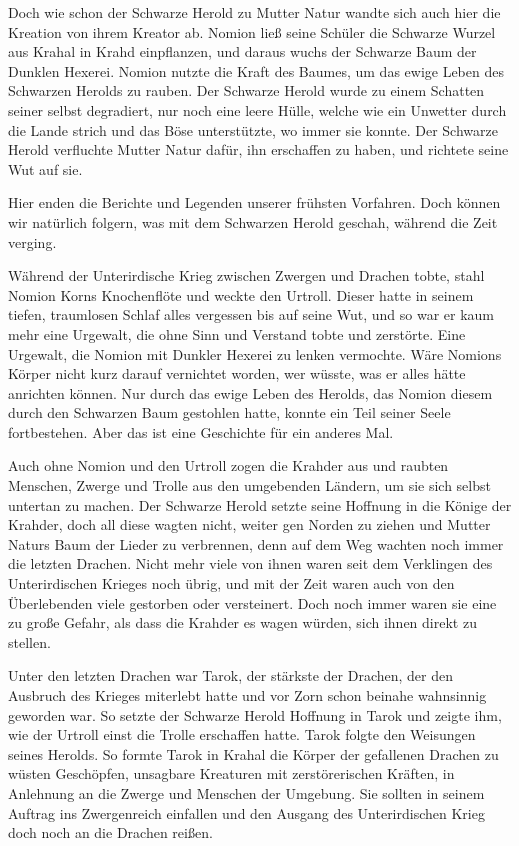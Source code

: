 Doch wie schon der Schwarze Herold zu Mutter Natur wandte sich auch hier die Kreation von ihrem Kreator ab. Nomion ließ seine Schüler die Schwarze Wurzel aus Krahal in Krahd einpflanzen, und daraus wuchs der Schwarze Baum der Dunklen Hexerei. Nomion nutzte die Kraft des Baumes, um das ewige Leben des Schwarzen Herolds zu rauben. Der Schwarze Herold wurde zu einem Schatten seiner selbst degradiert, nur noch eine leere Hülle, welche wie ein Unwetter durch die Lande strich und das Böse unterstützte, wo immer sie konnte. Der Schwarze Herold verfluchte Mutter Natur dafür, ihn erschaffen zu haben, und richtete seine Wut auf sie.

\trennzeichen

Hier enden die Berichte und Legenden unserer frühsten Vorfahren. Doch können wir natürlich folgern, was mit dem Schwarzen Herold geschah, während die Zeit verging.

Während der Unterirdische Krieg zwischen Zwergen und Drachen tobte, stahl Nomion Korns Knochenflöte und weckte den Urtroll. Dieser hatte in seinem tiefen, traumlosen Schlaf alles vergessen bis auf seine Wut, und so war er kaum mehr eine Urgewalt, die ohne Sinn und Verstand tobte und zerstörte. Eine Urgewalt, die Nomion mit Dunkler Hexerei zu lenken vermochte. Wäre Nomions Körper nicht kurz darauf vernichtet worden, wer wüsste, was er alles hätte anrichten können. Nur durch das ewige Leben des Herolds, das Nomion diesem durch den Schwarzen Baum gestohlen hatte, konnte ein Teil seiner Seele fortbestehen. Aber das ist eine Geschichte für ein anderes Mal.

Auch ohne Nomion und den Urtroll zogen die Krahder aus und raubten Menschen, Zwerge und Trolle aus den umgebenden Ländern, um sie sich selbst untertan zu machen. Der Schwarze Herold setzte seine Hoffnung in die Könige der Krahder, doch all diese wagten nicht, weiter gen Norden zu ziehen und Mutter Naturs Baum der Lieder zu verbrennen, denn auf dem Weg wachten noch immer die letzten Drachen. Nicht mehr viele von ihnen waren seit dem Verklingen des Unterirdischen Krieges noch übrig, und mit der Zeit waren auch von den Überlebenden viele gestorben oder versteinert. Doch noch immer waren sie eine zu große Gefahr, als dass die Krahder es wagen würden, sich ihnen direkt zu stellen.

Unter den letzten Drachen war Tarok, der stärkste der Drachen, der den Ausbruch des Krieges miterlebt hatte und vor Zorn schon beinahe wahnsinnig geworden war. So setzte der Schwarze Herold Hoffnung in Tarok und zeigte ihm, wie der Urtroll einst die Trolle erschaffen hatte. Tarok folgte den Weisungen seines Herolds. So formte Tarok in Krahal die Körper der gefallenen Drachen zu wüsten Geschöpfen, unsagbare Kreaturen mit zerstörerischen Kräften, in Anlehnung an die Zwerge und Menschen der Umgebung. Sie sollten in seinem Auftrag ins Zwergenreich einfallen und den Ausgang des Unterirdischen Krieg doch noch an die Drachen reißen.

